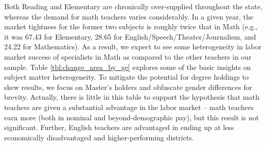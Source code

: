 \documentclass[12pt,]{article}
\begin{document}
Both Reading and Elementary are chronically over-supplied throughout the
state, whereas the demand for math teachers varies considerably. In a
given year, the market tightness for the former two subjects is roughly
twice that in Math (e.g., it was 67.43 for Elementary, 28.65 for
English/Speech/Theater/Journalism, and 24.22 for Mathematics). As a
result, we expect to see some heterogeneity in labor market success of
specialists in Math as compared to the other teachers in our sample.
Table \ref{tbl:change_area_by_ge} explores some of the basic insights on
subject matter heterogeneity. To mitigate the potential for degree
holdings to skew results, we focus on Master's holders and obfuscate
gender differences for brevity. Actually, there is little in this table
to support the hypothesis that math teachers are given a substantial
advantage in the labor market -- math teachers earn more (both in
nominal and beyond-demographic pay), but this result is not significant.
Further, English teachers are advantaged in ending up at less
economically disadvantaged and higher-performing districts.
\end{document}
